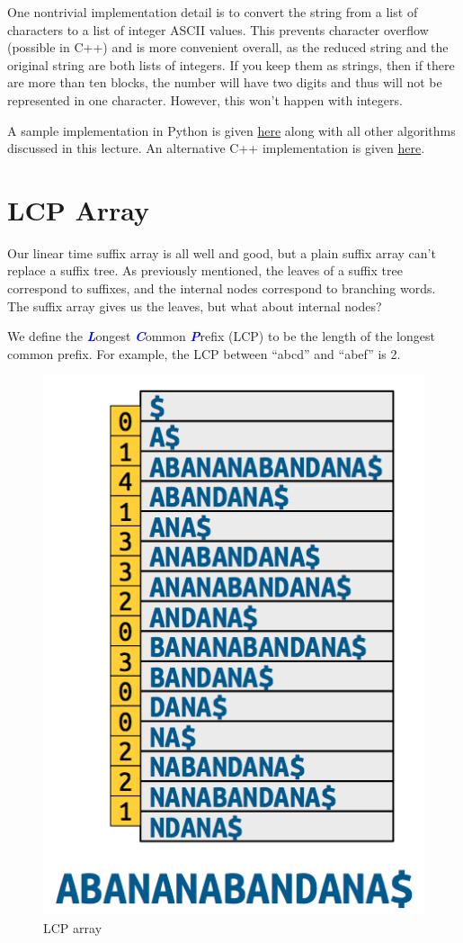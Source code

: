 \documentclass[11pt, oneside]{article}
\newcommand{\emphasis}[1]{\textcolor{blue}{\textbf{\textit{#1}}}}
\begin{document}
One nontrivial implementation detail is to convert the string from a list of characters
to a list of integer ASCII values. This prevents character overflow (possible in C++)
and is more convenient overall, as the reduced string and the original string are both lists of integers.
If you keep them as strings, then if there are more than ten blocks, the number will have two digits
and thus will not be represented in one character. However, this won't happen with integers.

A sample implementation in Python is given \href{https://gist.github.com/stephen-huan/aa609965c86d750736398c28b025f9be#suffix-array}{here}
along with all other algorithms discussed in this lecture.
An alternative C++ implementation is given \href{https://gist.github.com/stephen-huan/d660e04476f06695663401d0ac01a27a#suffix-array}{here}.

\section{LCP Array}

Our linear time suffix array is all well and good, but a plain suffix array can't replace a suffix tree.
As previously mentioned, the leaves of a suffix tree correspond to suffixes, and the internal nodes correspond to branching words.
The suffix array gives us the leaves, but what about internal nodes?

We define the \emphasis{L}ongest \emphasis{C}ommon \emphasis{P}refix (LCP)
to be the length of the longest common prefix.
For example, the LCP between ``abcd'' and ``abef'' is 2.

\begin{figure}[h!]
\centering
\includegraphics[scale=0.25]{lcp}
\caption{LCP array}
\end{figure}
\end{document}
